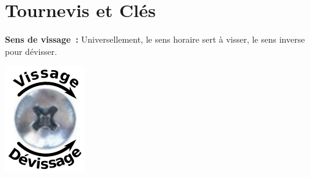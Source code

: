 \section*{Tournevis et Clés}
\begin{minipage}{0.8\columnwidth}
\textbf{Sens de vissage~:} Universellement, le sens horaire sert à visser, le sens inverse pour dévisser.

\end{minipage}
\hspace{0.06\columnwidth}
\begin{minipage}[][][c]{0.12\columnwidth}
\includegraphics[width=\columnwidth]{pics/sens-vissage.pdf}
\end{minipage}

